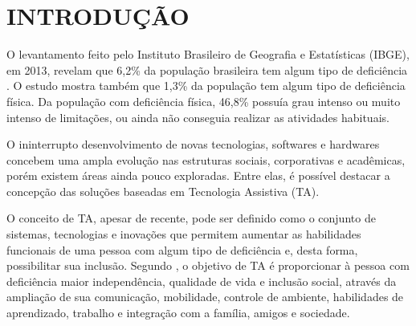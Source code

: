 \chapter{INTRODUÇÃO}\label{CAP:introducao}

O levantamento feito pelo Instituto Brasileiro de Geografia e Estatísticas (IBGE), em 2013, revelam que 6,2\% da população brasileira tem algum tipo de deficiência . O estudo mostra também que 1,3\% da população tem algum tipo de deficiência física. Da população com deficiência física, 46,8\% possuía grau intenso ou muito intenso de limitações, ou ainda não conseguia realizar as atividades habituais.

% 
% 
% 
% 

O ininterrupto desenvolvimento de novas tecnologias, softwares e hardwares concebem uma ampla evolução nas estruturas sociais, corporativas e acadêmicas, porém existem áreas ainda pouco exploradas. Entre elas, é possível destacar a concepção das soluções baseadas em Tecnologia Assistiva (TA).

O conceito de TA, apesar de recente, pode ser definido como o conjunto de sistemas, tecnologias e inovações que permitem aumentar as habilidades funcionais de uma pessoa com algum tipo de deficiência e, desta forma, possibilitar sua inclusão. Segundo , o objetivo de TA é proporcionar à pessoa com deficiência maior independência, qualidade de vida e inclusão social, através da ampliação de sua comunicação, mobilidade, controle de ambiente, habilidades de aprendizado, trabalho e integração com a família, amigos e sociedade.

